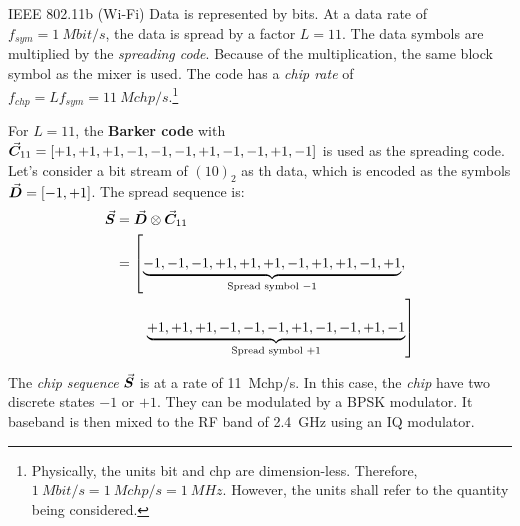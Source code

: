 \begin{refsection}
\begin{example}{\acs{IEEE} 802.11b (Wi-Fi)}
	Data is represented by bits. At a data rate of $f_{sym} = \SI{1}{Mbit/s}$, the data is spread by a factor $L = 11$. The data symbols are multiplied by the \emph{spreading code}. Because of the multiplication, the same block symbol as the mixer is used. The code has a \emph{chip rate} of $f_{chp} = L f_{sym} = \SI{11}{Mchp/s}$.\footnote{Physically, the units \si{bit} and \si{chp} are dimension-less. Therefore, $\SI{1}{Mbit/s} = \SI{1}{Mchp/s} = \SI{1}{MHz}$. However, the units shall refer to the quantity being considered.}
	
	\vspace{0.5em}
	
	For $L = 11$, the  \textbf{Barker code} with $\vec{\bm{C}}_{11} = \left[+1, +1, +1, -1, -1, -1, +1, -1, -1, +1, -1\right]$ is used as the spreading code. Let's consider a bit stream of $(10)_2$ as th data, which is encoded as the symbols $\vec{\bm{D}} = \left[-1, +1\right]$. The spread sequence is:
	\begin{equation}
		\begin{split}
			\vec{\bm{S}} &= \vec{\bm{D}} \otimes \vec{\bm{C}}_{11} \\
			 &= \left[\underbrace{-1, -1, -1, +1, +1, +1, -1, +1, +1, -1, +1}_{\text{Spread symbol } -1},\right. \\ &\qquad \left.  \underbrace{+1, +1, +1, -1, -1, -1, +1, -1, -1, +1, -1}_{\text{Spread symbol } +1}\right]
		\end{split}
	\end{equation}
	
	The \emph{chip sequence} $\vec{\bm{S}}$ is at a rate of \SI{11}{Mchp/s}. In this case, the \emph{chip} have two discrete states $-1$ or $+1$. They can be modulated by a \ac{BPSK} modulator. It baseband is then mixed to the \ac{RF} band of \SI{2.4}{GHz} using an IQ modulator.
	
	\begin{figure}[H]
		\centering
		
\end{figure}
\end{example}
\end{refsection}
